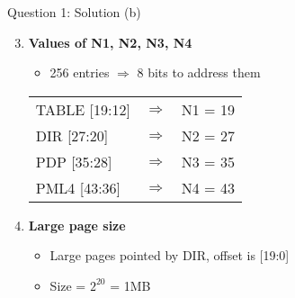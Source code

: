 \documentclass[aspectratio=169,12pt]{beamer}
\begin{document}
\begin{frame}{Question 1: Solution (b)}
\begin{enumerate}
    \setcounter{enumi}{2}
    \item \textbf{Values of N1, N2, N3, N4}
    \begin{itemize}
        \item 256 entries $\Rightarrow$ 8 bits to address them
    \end{itemize}
    \begin{center}
        \begin{tabular}{lcl}
            TABLE [19:12] & $\Rightarrow$ & N1 = 19\\
            DIR [27:20]   & $\Rightarrow$ & N2 = 27\\
            PDP [35:28]   & $\Rightarrow$ & N3 = 35\\
            PML4 [43:36]  & $\Rightarrow$ & N4 = 43
        \end{tabular}
    \end{center}

    \item \textbf{Large page size}
    \begin{itemize}
        \item Large pages pointed by DIR, offset is [19:0]
        \item Size = $2^{20}$ = 1MB
    \end{itemize}
\end{enumerate}
\end{frame}
\end{document}
